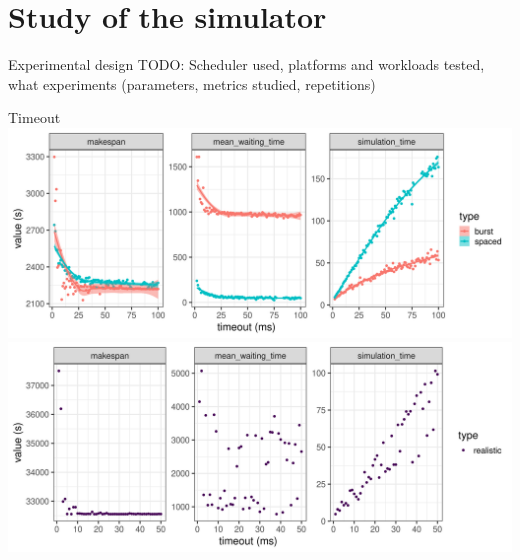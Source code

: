 \documentclass[12pt, aspectratio=43]{beamer}
\begin{document}
\section{Study of the simulator}

\begin{frame}{Experimental design}
	TODO: Scheduler used, platforms and workloads tested, what experiments (parameters, metrics studied, repetitions)
\end{frame}

\begin{frame}[allowframebreaks]{Timeout}
	\centering
	\includegraphics[width=\textwidth]{../imgs/timeout_burst_spaced.png}
	\includegraphics[width=\textwidth]{../imgs/timeout_realistic.png}
\end{frame}
\end{document}
